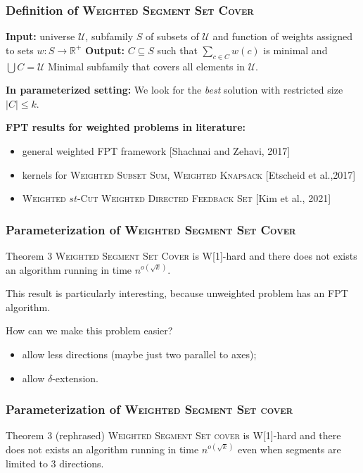 \documentclass{beamer}
\begin{document}
\begin{frame}
\frametitle{Definition of \textsc{Weighted Segment Set Cover}}

\textbf{Input:} universe $\mathcal{U}$,
subfamily $S$ of subsets of $\mathcal{U}$
and function of weights assigned to sets $w : S \rightarrow \mathbb{R^+}$
\newline
\textbf{Output:} $C \subseteq S$ such that $\sum_{c \in C} w(c)$ is minimal and
$\bigcup C = \mathcal{U}$
\newline
Minimal subfamily that covers all elements in $\mathcal{U}$.

\pause

\bigskip
\textbf{In parameterized setting:}
We look for the \textit{best} solution with restricted size $|C| \le k$.
\bigskip
\pause

\textbf{FPT results for weighted problems in literature:}
\begin{itemize}
\item general weighted FPT framework {[Shachnai and Zehavi, 2017]}
\item kernels for \textsc{Weighted Subset Sum}, \textsc{Weighted Knapsack} {[Etscheid et al.,2017]}
\item \textsc{Weighted $st$-Cut} \textsc{Weighted Directed Feedback Set} {[Kim et al., 2021]}
\end{itemize}


\end{frame}

\begin{frame}
\frametitle{Parameterization of \textsc{Weighted Segment Set Cover}}
\begin{block}{Theorem 3}
	\textsc{Weighted Segment Set Cover} is W[1]-hard
	and there does not exists an algorithm running in time $n^{o(\sqrt{k})}$.
\end{block}


This result is particularly interesting, because unweighted problem 
has an FPT algorithm.

\bigskip

\pause
How can we make this problem easier?
\begin{itemize}
\item allow less directions (maybe just two parallel to axes);
\item allow $\delta$-extension.
\end{itemize}
\end{frame}

\begin{frame}
\frametitle{Parameterization of \textsc{Weighted Segment Set cover}}

\begin{block}{Theorem 3 (rephrased)}
	\textsc{Weighted Segment Set cover} is W[1]-hard
	and there does not exists an algorithm running in time $n^{o(\sqrt{k})}$
	even when segments are limited to 3 directions.
\end{block}

\end{frame}
\end{document}
